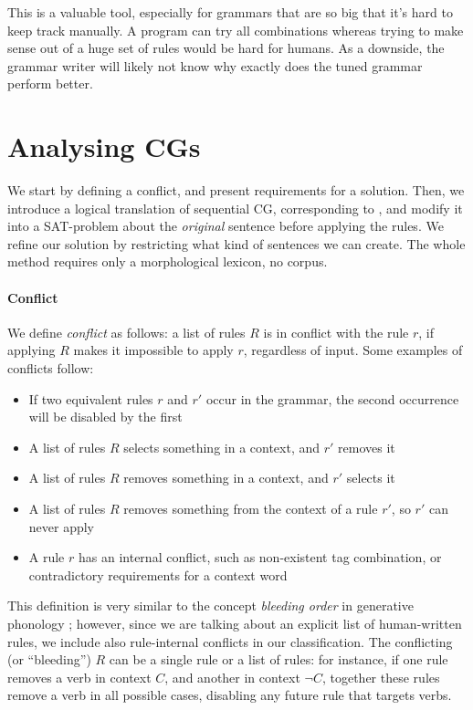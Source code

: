 This is a valuable tool, especially for grammars that are so big that it's hard to keep track manually. A program can try all combinations whereas trying to make sense out of a huge set of rules would be hard for humans.
As a downside, the grammar writer will likely not know why exactly does the tuned grammar perform better.


\section{Analysing CGs}
\label{sec:sectionCGana}

We start by defining a conflict, and present requirements for a solution.
Then, we introduce a logical translation of sequential CG, corresponding to \cite{lager_nivre01}, and modify it into a SAT-problem about the \emph{original} sentence before applying the rules.
We refine our solution by restricting what kind of sentences we can create.
The whole method requires only a morphological lexicon, no corpus. 

\paragraph{Conflict}

We define \emph{conflict} as follows: a list of rules $R$ is in conflict with the rule $r$, if applying $R$ makes it impossible to apply $r$, regardless of input. 
Some examples of conflicts follow:

\begin{itemize}
\item If two equivalent rules $r$ and $r'$ occur in the grammar, the second occurrence will be disabled by the first
\item A list of rules $R$ selects something in a context, and $r'$ removes it
\item A list of rules $R$ removes something in a context, and $r'$ selects it
\item A list of rules $R$ removes something from the context of a rule $r'$, so $r'$ can never apply
\item A rule $r$ has an internal conflict, such as non-existent
tag combination, or contradictory requirements for a context word
\end{itemize}

This definition is very similar to the concept \emph{bleeding order} in generative phonology ; however, since we are talking about an explicit list of 
human-written rules, we include also rule-internal conflicts in our classification.
The conflicting (or ``bleeding'') $R$ can be a single rule or a list of rules: for instance, if one rule removes a verb in
context $C$, and another in context $\neg C$, together these rules
remove a verb in all possible cases, disabling any future rule that
targets verbs.

